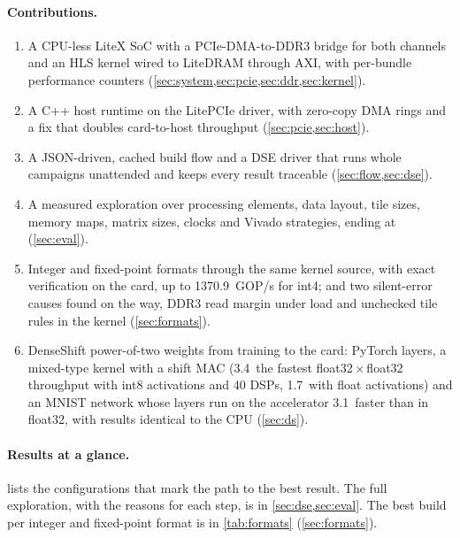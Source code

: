 \paragraph{Contributions.}
\begin{enumerate}
  \item A CPU-less LiteX SoC with a PCIe-DMA-to-DDR3 bridge for both channels and an HLS kernel wired to LiteDRAM
        through AXI, with per-bundle performance counters (\cref{sec:system,sec:pcie,sec:ddr,sec:kernel}).
  \item A C++ host runtime on the LitePCIe driver, with zero-copy DMA rings and a fix that doubles card-to-host
        throughput (\cref{sec:pcie,sec:host}).
  \item A JSON-driven, cached build flow and a DSE driver that runs whole campaigns unattended and keeps every
        result traceable (\cref{sec:flow,sec:dse}).
  \item A measured exploration over processing elements, data layout, tile sizes, memory maps, matrix sizes, clocks
        and Vivado strategies, ending at  (\cref{sec:eval}).
  \item Integer and fixed-point formats through the same kernel source, with exact verification on the card, up to
        \SI{1370.9}{GOP/s} for int4; and two silent-error causes found on the way, DDR3 read margin under load and
        unchecked tile rules in the kernel (\cref{sec:formats}).
  \item DenseShift power-of-two weights from training to the card: PyTorch layers, a mixed-type kernel with a shift
        MAC (3.4\x\ the fastest float32\,\(\times\)\,float32 throughput with int8 activations and 40 DSPs, 1.7\x\
        with float activations) and an MNIST network whose layers run on the accelerator 3.1\x\ faster than in
        float32, with results identical to the CPU (\cref{sec:ds}).
\end{enumerate}

\paragraph{Results at a glance.}  lists the configurations that mark the path to the best result.
The full exploration, with the reasons for each step, is in \cref{sec:dse,sec:eval}. The best build per integer and
fixed-point format is in \cref{tab:formats} (\cref{sec:formats}).


